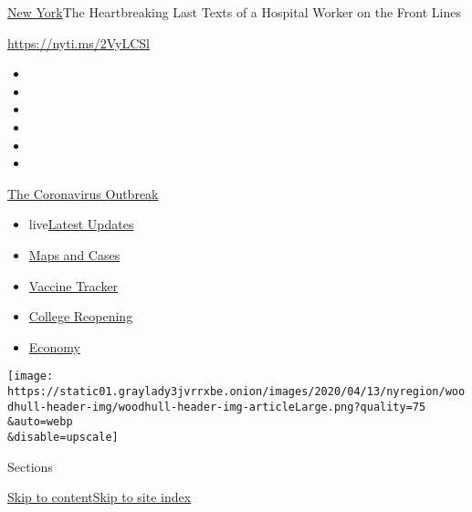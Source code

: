 \href{/section/nyregion}{New York}\textbar{}The Heartbreaking Last Texts
of a Hospital Worker on the Front Lines

\url{https://nyti.ms/2VyLCSl}

\begin{itemize}
\item
\item
\item
\item
\item
\item
\end{itemize}

\href{https://www.nytimes3xbfgragh.onion/news-event/coronavirus?action=click\&pgtype=Article\&state=default\&region=TOP_BANNER\&context=storylines_menu}{The
Coronavirus Outbreak}

\begin{itemize}
\tightlist
\item
  live\href{https://www.nytimes3xbfgragh.onion/2020/08/04/world/coronavirus-cases.html?action=click\&pgtype=Article\&state=default\&region=TOP_BANNER\&context=storylines_menu}{Latest
  Updates}
\item
  \href{https://www.nytimes3xbfgragh.onion/interactive/2020/us/coronavirus-us-cases.html?action=click\&pgtype=Article\&state=default\&region=TOP_BANNER\&context=storylines_menu}{Maps
  and Cases}
\item
  \href{https://www.nytimes3xbfgragh.onion/interactive/2020/science/coronavirus-vaccine-tracker.html?action=click\&pgtype=Article\&state=default\&region=TOP_BANNER\&context=storylines_menu}{Vaccine
  Tracker}
\item
  \href{https://www.nytimes3xbfgragh.onion/2020/08/02/us/covid-college-reopening.html?action=click\&pgtype=Article\&state=default\&region=TOP_BANNER\&context=storylines_menu}{College
  Reopening}
\item
  \href{https://www.nytimes3xbfgragh.onion/live/2020/08/04/business/stock-market-today-coronavirus?action=click\&pgtype=Article\&state=default\&region=TOP_BANNER\&context=storylines_menu}{Economy}
\end{itemize}

\texttt{[image: https://static01.graylady3jvrrxbe.onion/images/2020/04/13/nyregion/woodhull-header-img/woodhull-header-img-articleLarge.png?quality=75\\\&auto=webp\\\&disable=upscale]}

Sections

\protect\hyperlink{site-content}{Skip to
content}\protect\hyperlink{site-index}{Skip to site index}

